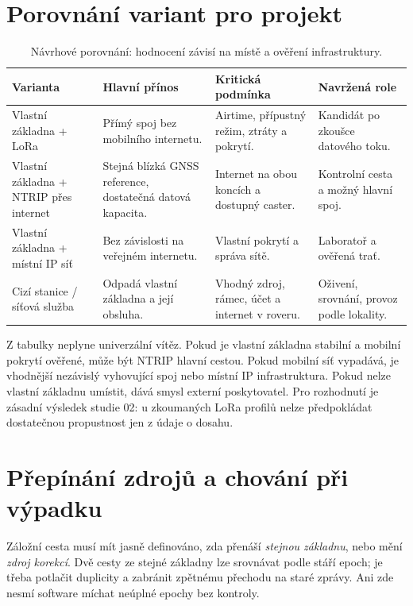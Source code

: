 \documentclass[11pt,a4paper]{article}
\begin{document}
\section{Porovnání variant pro projekt}
\par
\begin{table}[htbp]\centering\small
\caption{Návrhové porovnání: hodnocení závisí na místě a ověření infrastruktury.}
\begin{tabularx}{\linewidth}{L{31mm}YYY}\toprule
Varianta & Hlavní přínos & Kritická podmínka & Navržená role\\\midrule
Vlastní základna + LoRa & Přímý spoj bez mobilního internetu. & Airtime, přípustný režim, ztráty a pokrytí. & Kandidát po zkoušce datového toku.\\
Vlastní základna + NTRIP přes internet & Stejná blízká GNSS reference, dostatečná datová kapacita. & Internet na obou koncích a dostupný caster. & Kontrolní cesta a možný hlavní spoj.\\
Vlastní základna + místní IP síť & Bez závislosti na veřejném internetu. & Vlastní pokrytí a správa sítě. & Laboratoř a ověřená trať.\\
Cizí stanice / síťová služba & Odpadá vlastní základna a její obsluha. & Vhodný zdroj, rámec, účet a internet v roveru. & Oživení, srovnání, provoz podle lokality.\\
\bottomrule\end{tabularx}\end{table}
\par

Z tabulky neplyne univerzální vítěz. Pokud je vlastní základna stabilní a mobilní pokrytí ověřené, může být NTRIP hlavní cestou. Pokud mobilní síť vypadává, je vhodnější nezávislý vyhovující spoj nebo místní IP infrastruktura. Pokud nelze vlastní základnu umístit, dává smysl externí poskytovatel. Pro rozhodnutí je zásadní výsledek studie 02: u zkoumaných LoRa profilů nelze předpokládat dostatečnou propustnost jen z údaje o dosahu.

\section{Přepínání zdrojů a chování při výpadku}
Záložní cesta musí mít jasně definováno, zda přenáší \emph{stejnou základnu}, nebo mění \emph{zdroj korekcí}. Dvě cesty ze stejné základny lze srovnávat podle stáří epoch; je třeba potlačit duplicity a zabránit zpětnému přechodu na staré zprávy. Ani zde nesmí software míchat neúplné epochy bez kontroly.
\end{document}
